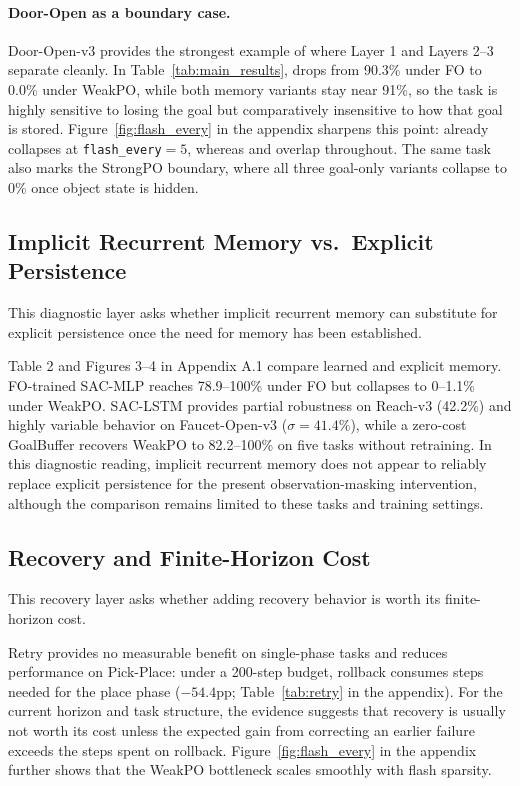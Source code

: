 

\paragraph{Door-Open as a boundary case.}
Door-Open-v3 provides the strongest example of where Layer 1 and Layers 2--3 separate cleanly. In Table~\ref{tab:main_results},  drops from 90.3\% under FO to 0.0\% under WeakPO, while both memory variants stay near 91\%, so the task is highly sensitive to losing the goal but comparatively insensitive to how that goal is stored. Figure~\ref{fig:flash_every} in the appendix sharpens this point:  already collapses at \texttt{flash\_every}$=5$, whereas  and  overlap throughout. The same task also marks the StrongPO boundary, where all three goal-only variants collapse to 0\% once object state is hidden.

\subsection{Implicit Recurrent Memory vs.\ Explicit Persistence}
\label{sec:lstm_vs_goalbuffer}

This diagnostic layer asks whether implicit recurrent memory can substitute for explicit persistence once the need for memory has been established.

Table 2 and Figures 3--4 in Appendix A.1 compare learned and explicit memory. FO-trained SAC-MLP reaches 78.9--100\% under FO but collapses to 0--1.1\% under WeakPO. SAC-LSTM provides partial robustness on Reach-v3 (42.2\%) and highly variable behavior on Faucet-Open-v3 ($\sigma=41.4\%$), while a zero-cost GoalBuffer recovers WeakPO to 82.2--100\% on five tasks without retraining. In this diagnostic reading, implicit recurrent memory does not appear to reliably replace explicit persistence for the present observation-masking intervention, although the comparison remains limited to these tasks and training settings.

\subsection{Recovery and Finite-Horizon Cost}
\label{sec:recovery_cost}

This recovery layer asks whether adding recovery behavior is worth its finite-horizon cost.

Retry provides no measurable benefit on single-phase tasks and reduces performance on Pick-Place: under a 200-step budget, rollback consumes steps needed for the place phase ($-54.4$pp; Table~\ref{tab:retry} in the appendix). For the current horizon and task structure, the evidence suggests that recovery is usually not worth its cost unless the expected gain from correcting an earlier failure exceeds the steps spent on rollback. Figure~\ref{fig:flash_every} in the appendix further shows that the WeakPO bottleneck scales smoothly with flash sparsity.

